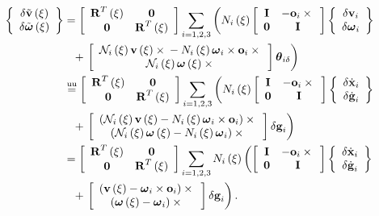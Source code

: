 \begin{align}
	\cubr{\cvvect{
		\delta\tilde{\T{v}}\plbr{\xi} \\
		\delta\tilde{\T{\omega}}\plbr{\xi}
	}}
	&=
	\sqbr{\matr{cc}{
		\TT{R}^T\plbr{\xi} & \TT{0} \\
		\TT{0} & \TT{R}^T\plbr{\xi}
	}} \sum_{i=1,2,3} \lplbr{
		N_i\plbr{\xi} \sqbr{\matr{cc}{
			\TT{I} & - \T{o}_i \times{} \\
			\TT{0} & \TT{I}
		}} \cubr{\cvvect{
			\delta\T{v}_i \\
			\delta\T{\omega}_i
		}}
	}
	\nonumber \\
	& \hphantom{= } \mbox{}
	+ \rplbr{
		\sqbr{\cvvect{
			\mathcal{N}_i\plbr{\xi} \T{v}\plbr{\xi} \times{}
			- N_i\plbr{\xi} \T{\omega}_i \times \T{o}_i \times{} \\
			\mathcal{N}_i\plbr{\xi} \T{\omega}\plbr{\xi} \times{}
		}} \T{\theta}_{i\delta}
	}
	\nonumber \\
	&\equu
	\sqbr{\matr{cc}{
		\TT{R}^T\plbr{\xi} & \TT{0} \\
		\TT{0} & \TT{R}^T\plbr{\xi}
	}} \sum_{i=1,2,3} \lplbr{
		N_i\plbr{\xi} \sqbr{\matr{cc}{
			\TT{I} & - \T{o}_i \times{} \\
			\TT{0} & \TT{I}
		}} \cubr{\cvvect{
			\delta\dot{\T{x}}_i \\
			\delta\dot{\T{g}}_i
		}}
	}
	\nonumber \\
	& \hphantom{= } \mbox{}
	+ \rplbr{
		\sqbr{\cvvect{
			\plbr{
				\mathcal{N}_i\plbr{\xi} \T{v}\plbr{\xi}
				- N_i\plbr{\xi} \T{\omega}_i \times \T{o}_i
			} \times{} \\
			\plbr{
				\mathcal{N}_i\plbr{\xi} \T{\omega}\plbr{\xi}
				- N_i\plbr{\xi} \T{\omega}_i
			} \times{}
		}} \delta\T{g}_i
	}
	\nonumber \\
	&=
	\sqbr{\matr{cc}{
		\TT{R}^T\plbr{\xi} & \TT{0} \\
		\TT{0} & \TT{R}^T\plbr{\xi}
	}} \sum_{i=1,2,3} N_i\plbr{\xi} \lplbr{
		\sqbr{\matr{cc}{
			\TT{I} & - \T{o}_i \times{} \\
			\TT{0} & \TT{I}
		}} \cubr{\cvvect{
			\delta\dot{\T{x}}_i \\
			\delta\dot{\T{g}}_i
		}}
	}
	\nonumber \\
	& \hphantom{= } \mbox{}
	+ \rplbr{
		\sqbr{\cvvect{
			\plbr{
				\T{v}\plbr{\xi}
				- \T{\omega}_i \times \T{o}_i
			} \times{} \\
			\plbr{
				\T{\omega}\plbr{\xi}
				- \T{\omega}_i
			} \times{}
		}} \delta\T{g}_i
	}
	.
\end{align}

